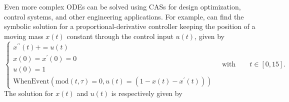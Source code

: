 Even more complex \acp{ODE} can be solved using \acp{CAS} for design optimization, control systems, and other engineering applications. For example, \Mathematica{} can find the symbolic solution for a proportional-derivative controller keeping the position of a moving mass $x(t)$ constant through the control input $u(t)$, given by
%
\begin{equation}
  \begin{cases}
    x^{\prime\prime}(t) + = u(t) \\[0.1em]
    x(0) = x^{\prime}(0) = 0 \\[0.1em]
    u(0) = 1 \\[0.1em]
    \mathrm{WhenEvent}(\mathrm{mod}(t, \tau) = 0, u(t) = (1 - x(t) - x^{\prime}(t)))
  \end{cases}
  \quad \text{with} \qquad t \in [0, 15].
\end{equation}
%
The solution for $x(t)$ and $u(t)$ is respectively given by
%
